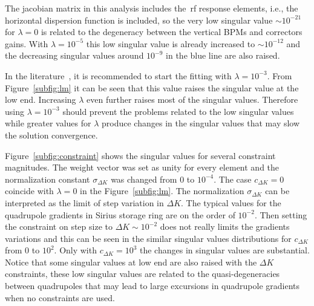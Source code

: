The jacobian matrix in this analysis includes the~\gls{rf} response elements, i.e., the horizontal dispersion function is included, so the very low singular value $\sim10^{-21}$ for $\lambda = 0$ is related to the degeneracy between the vertical BPMs and correctors gains. With $\lambda = 10^{-5}$ this low singular value is already increased to $\sim10^{-12}$ and the decreasing singular values around $10^{-9}$ in the blue line are also raised. 

In the literature~\cite{icfa_huang, huang2013}, it is recommended to start the fitting with $\lambda = 10^{-3}$. From Figure~\ref{subfig:lm} it can be seen that this value raises the singular value at the low end. Increasing $\lambda$ even further raises most of the singular values. Therefore using $\lambda=10^{-3}$ should prevent the problems related to the low singular values while greater values for $\lambda$ produce changes in the singular values that may slow the solution convergence.

Figure~\ref{subfig:constraint} shows the singular values for several constraint magnitudes. The weight vector was set as unity for every element and the normalization constant $\sigma_{\Delta K}$ was changed from $0$ to $10^{-4}$. The case $c_{\Delta K} = 0$ coincide with $\lambda = 0$ in the Figure~\ref{subfig:lm}. The normalization $\sigma_{\Delta K}$ can be interpreted as the limit of step variation in $\Delta K$. The typical values for the quadrupole gradients in Sirius storage ring are on the order of $10^{-2}$. Then setting the constraint on step size to $\Delta K \sim 10^{-2}$ does not really limits the gradients variations and this can be seen in the similar singular values distributions for $c_{\Delta K}$ from $0$ to $10^{2}$. Only with $c_{\Delta K}=10^{3}$ the changes in singular values are substantial. Notice that some singular values at low end are also raised with the $\Delta K$ constraints, these low singular values are related to the quasi-degeneracies between quadrupoles that may lead to large excursions in quadrupole gradients when no constraints are used.

